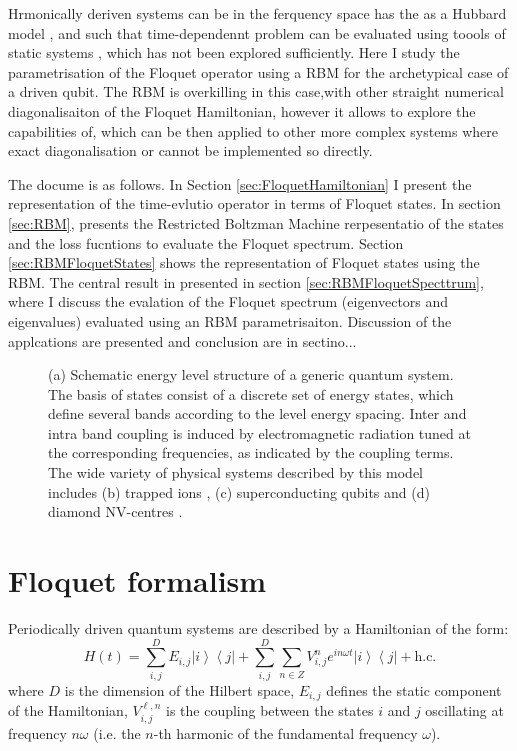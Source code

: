 \documentclass[pra,twocolumn,showkeys,preprintnumbers, amsmath,amssymb, aps,A4paper]{revtex4-1}
\begin{document}
Hrmonically deriven systems can be in the ferquency space has the as a Hubbard model \cite{mine and othres}, and such that time-dependennt problem can be evaluated using toools of static systems \cite{}, which has not been explored sufficiently. Here I study the parametrisation of the Floquet operator using a RBM for the archetypical case of a driven qubit. The RBM is overkilling in this case,with other straight numerical diagonalisaiton of the Floquet Hamiltonian, however it allows to explore the capabilities of, which can be then applied to other more complex systems where exact diagonalisation or cannot be implemented so directly.

The docume is as follows. In Section \ref{sec:FloquetHamiltonian} I present the representation of the time-evlutio operator in terms of Floquet states. In section \ref{sec:RBM}, presents the Restricted Boltzman Machine rerpesentatio of the states and the loss fucntions to evaluate the Floquet spectrum. Section \ref{sec:RBMFloquetStates} shows the representation of Floquet states using the RBM. The central result in presented in section \ref{sec:RBMFloquetSpecttrum}, where I discuss the evalation of the Floquet spectrum (eigenvectors and eigenvalues) evaluated using an RBM parametrisaiton. Discussion of the applcations are presented and conclusion are in sectino...


\begin{figure}
\centering
\caption{\label{fig:SystemSketch} (a) Schematic energy level structure of a generic quantum system. The basis of states consist of a discrete set of energy states, which define several bands according to the level energy spacing. Inter and intra band coupling is induced by electromagnetic radiation tuned at the corresponding frequencies, as indicated by the coupling terms. The wide variety of physical systems described by this model includes (b) trapped ions \cite{PhysRevLett.117.220501}, (c) superconducting qubits \cite{vion2002manipulating} and (d) diamond NV-centres \cite{balasubramanian2009ultralong}.}
\end{figure}


\section{\label{sec:FloquetBloch} Floquet formalism}

Periodically driven quantum systems are described by a Hamiltonian of the form:
\begin{equation}
H(t) = \sum_{i,j}^D E_{i,j} \left| i\right\rangle \left\langle j \right| + \sum_{i,j}^D \sum_{n \in Z} V_{i,j}^{n} e^{i n \omega t} \left| i\right\rangle \left\langle j \right| + \textrm{h.c.}
\label{eq:Hamiltonian}
\end{equation}
where $D$ is the dimension of the Hilbert space, ${E_{i,j}}$ defines the static component of the Hamiltonian, $V_{i,j}^{\ell,n}$ is the coupling between the states $i$ and $j$ oscillating at frequency $n \omega$ (i.e. the $n$-th harmonic of the fundamental frequency $\omega$). 
\end{document}
